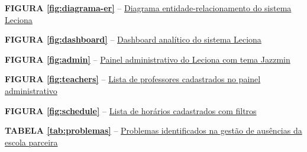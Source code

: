 
\vspace{2\baselineskip}

\noindent\textbf{FIGURA \ref{fig:diagrama-er}} -- \hyperref[fig:diagrama-er]{Diagrama entidade-relacionamento do sistema Leciona}\dotfill\textbf{\pageref{fig:diagrama-er}}

\vspace{\baselineskip}

\noindent\textbf{FIGURA \ref{fig:dashboard}} -- \hyperref[fig:dashboard]{Dashboard analítico do sistema Leciona}\dotfill\textbf{\pageref{fig:dashboard}}

\vspace{\baselineskip}

\noindent\textbf{FIGURA \ref{fig:admin}} -- \hyperref[fig:admin]{Painel administrativo do Leciona com tema Jazzmin}\dotfill\textbf{\pageref{fig:admin}}

\vspace{\baselineskip}

\noindent\textbf{FIGURA \ref{fig:teachers}} -- \hyperref[fig:teachers]{Lista de professores cadastrados no painel administrativo}\dotfill\textbf{\pageref{fig:teachers}}

\vspace{\baselineskip}

\noindent\textbf{FIGURA \ref{fig:schedule}} -- \hyperref[fig:schedule]{Lista de horários cadastrados com filtros}\dotfill\textbf{\pageref{fig:schedule}}

\clearpage


\vspace{2\baselineskip}

\noindent\textbf{TABELA \ref{tab:problemas}} -- \hyperref[tab:problemas]{Problemas identificados na gestão de ausências da escola parceira}\dotfill\textbf{\pageref{tab:problemas}}

\clearpage


\vspace{2\baselineskip}

